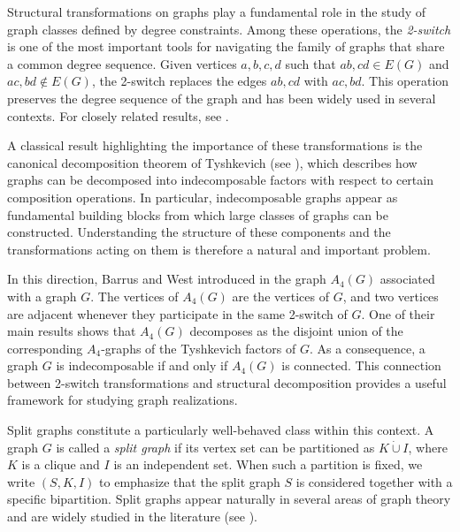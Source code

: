 \documentclass[11pt]{elsarticle}
\begin{document}
Structural transformations on graphs play a fundamental role in the study of graph classes defined by degree constraints. Among these operations, the \emph{2-switch} is one of the most important tools for navigating the family of graphs that share a common degree sequence. Given vertices $a,b,c,d$ such that $ab,cd\in E(G)$ and $ac,bd\notin E(G)$, the 2-switch replaces the edges $ab,cd$ with $ac,bd$. This operation preserves the degree sequence of the graph and has been widely used in several contexts. For closely related results, see \cite{arikati1999realization,pastine20252,schvollner20262,taylor2006contrained}. 

A classical result highlighting the importance of these transformations is the canonical decomposition theorem of Tyshkevich (see \cite{tyshkevich2000decomposition}), which describes how graphs can be decomposed into indecomposable factors with respect to certain composition operations. In particular, indecomposable graphs appear as fundamental building blocks from which large classes of graphs can be constructed. Understanding the structure of these components and the transformations acting on them is therefore a natural and important problem.

In this direction, Barrus and West introduced in \cite{barrus.west.A4} the graph $A_4(G)$ associated with a graph $G$. The vertices of $A_4(G)$ are the vertices of $G$, and two vertices are adjacent whenever they participate in the same 2-switch of $G$. One of their main results shows that $A_4(G)$ decomposes as the disjoint union of the corresponding $A_4$-graphs of the Tyshkevich factors of $G$. As a consequence, a graph $G$ is indecomposable if and only if $A_4(G)$ is connected. This connection between 2-switch transformations and structural decomposition provides a useful framework for studying graph realizations.

Split graphs constitute a particularly well-behaved class within this context. A graph $G$ is called a \emph{split graph} if its vertex set can be partitioned as $K\dot\cup I$, where $K$ is a clique and $I$
is an independent set. When such a partition is fixed, we write $(S,K,I)$ to emphasize that the split graph $S$ is considered together with a specific bipartition. Split graphs appear naturally in
several areas of graph theory and are widely studied in the literature (see \cite{splitnordhausgaddum,hammer1977split,jaume2025nullspace,whitman2020split}).
\end{document}

